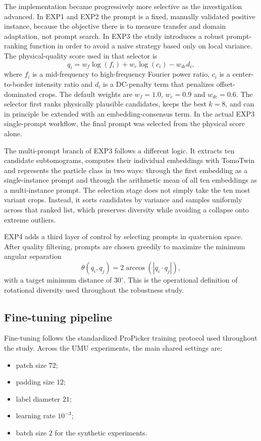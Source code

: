 \documentclass[12pt,a4paper]{report}
\begin{document}
The implementation became progressively more selective as the investigation advanced. In EXP1 and EXP2 the prompt is a fixed, manually validated positive instance, because the objective there is to measure transfer and domain adaptation, not prompt search. In EXP3 the study introduces a robust prompt-ranking function in order to avoid a naive strategy based only on local variance. The physical-quality score used in that selector is
\[
q_i = w_f \log(f_i) + w_c \log(c_i) - w_{dc} d_i,
\]
where \(f_i\) is a mid-frequency to high-frequency Fourier power ratio, \(c_i\) is a center-to-border intensity ratio and \(d_i\) is a DC-penalty term that penalizes offset-dominated crops. The default weights are \(w_f = 1.0\), \(w_c = 0.9\) and \(w_{dc} = 0.6\). The selector first ranks physically plausible candidates, keeps the best \(k=8\), and can in principle be extended with an embedding-consensus term. In the actual EXP3 single-prompt workflow, the final prompt was selected from the physical score alone.

The multi-prompt branch of EXP3 follows a different logic. It extracts ten candidate subtomograms, computes their individual embeddings with TomoTwin and represents the particle class in two ways: through the first embedding as a single-instance prompt and through the arithmetic mean of all ten embeddings as a multi-instance prompt. The selection stage does not simply take the ten most variant crops. Instead, it sorts candidates by variance and samples uniformly across that ranked list, which preserves diversity while avoiding a collapse onto extreme outliers.

EXP4 adds a third layer of control by selecting prompts in quaternion space. After quality filtering, prompts are chosen greedily to maximize the minimum angular separation
\[
\theta(q_i,q_j)=2\arccos\left(|q_i \cdot q_j|\right),
\]
with a target minimum distance of \(30^\circ\). This is the operational definition of rotational diversity used throughout the robustness study.

\subsection{Fine-tuning pipeline}
Fine-tuning follows the standardized ProPicker training protocol used throughout the study. Across the UMU experiments, the main shared settings are:
\begin{itemize}
  \item patch size \(72\);
  \item padding size \(12\);
  \item label diameter \(21\);
  \item learning rate \(10^{-3}\);
  \item batch size \(2\) for the synthetic experiments.
\end{itemize}
\end{document}

